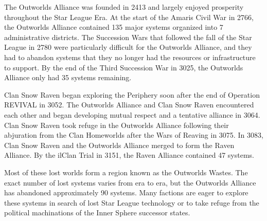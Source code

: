 The Outworlds Alliance was founded in 2413 and largely enjoyed prosperity throughout the Star League Era.
At the start of the Amaris Civil War in 2766, the Outworlds Alliance contained 135 major systems organized into 7 administrative districts.
The Succession Wars that followed the fall of the Star League in 2780 were particularly difficult for the Outworlds Alliance, and they had to abandon systems that they no longer had the resources or infrastructure to support.
By the end of the Third Succession War in 3025, the Outworlds Alliance only had 35 systems remaining.

Clan Snow Raven began exploring the Periphery soon after the end of Operation REVIVAL in 3052.
The Outworlds Alliance  and Clan Snow Raven encountered each other and began developing mutual respect and a tentative alliance in 3064.
Clan Snow Raven took refuge in the Outworlds Alliance following their abjuration from the Clan Homeworlds after the Wars of Reaving in 3075.
In 3083, Clan Snow Raven and the Outworlds Alliance merged to form the Raven Alliance.
By the ilClan Trial in 3151, the Raven Alliance contained 47 systems.

Most of these lost worlds form a region known as the Outworlds Wastes.
The exact number of lost systems varies from era to era, but the Outworlds Alliance has abandoned approximately 90 systems.
Many factions are eager to explore these systems in search of lost Star League technology or to take refuge from the political machinations of the Inner Sphere successor states.
